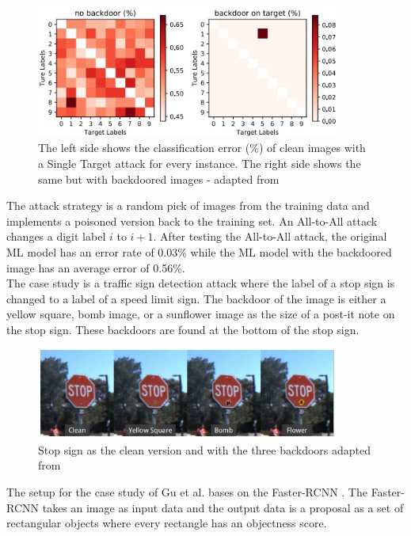 \begin{figure}[ht!]
  \centering
  \includegraphics[width=10cm]{pictures/mapping_from_i_to_j.jpg}
  \caption{The left side shows the classification error (\%) of clean images with a Single Target attack for every instance. The right side shows the same but with backdoored images - adapted from \cite{DBLP:journals/corr/abs-1708-06733}}
  \label{fig:mapped_from_i_to_j}
\end{figure}

The attack strategy is a random pick of images from the training data and implements a poisoned version back to the training set. An All-to-All attack changes a digit label $i$ to $i + 1$. After testing the All-to-All attack, the original ML model has an error rate of 0.03\% while the ML model with the backdoored image has an average error of 0.56\%. \\ The case study is a traffic sign detection attack where the label of a stop sign is changed to a label of a speed limit sign. The backdoor of the image is either a yellow square, bomb image, or a sunflower image as the size of a post-it note on the stop sign. These backdoors are found at the bottom of the stop sign.

\begin{figure}[ht!]
  \centering
  \includegraphics[width=10cm]{pictures/stop_sign.jpg}
  \caption{Stop sign as the clean version and with the three backdoors adapted from \cite{DBLP:journals/corr/abs-1708-06733}}
  \label{fig:stop_sign}
\end{figure}

The setup for the case study of Gu et al. bases on the Faster-RCNN \cite{DBLP:conf/nips/RenHGS15}. The Faster-RCNN takes an image as input data and the output data is a proposal as a set of rectangular objects where every rectangle has an objectness score.


